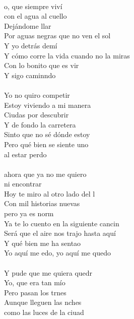 \begin{cancion}%
	     \\
	o, que siempre viví \\
con el agua al cuello\\
	Dejándome llar\\
Por aguas negras que no ven el sol\\
	Y yo detrás demí\\
Y cómo corre la vida cuando no la miras\\
	Con lo bonito que es vir\\
	Y sigo caminndo\\
\jump\\
	Yo no quiro competir\\
Estoy viviendo a mi manera\\
	Ciudas por descubrir\\
Y de fondo la carretera\\
	Sinto que no sé dónde estoy\\
Pero qué bien se siente uno \\
	al estar perdo  \\
\jump\\
	 ahora que ya no me quiero \\
ni encontrar\\
	Hoy te miro al otro lado del l\\
Con mil historias nuevas \\
	pero ya es norm\\
	Ya te lo cuento en la siguiente cancin \\
Será que el aire nos trajo hasta aquí\\
Y qué bien me ha sentao\\
	Yo aquí me edo, yo aquí me quedo\\
\jump\\
	Y pude que me quiera quedr\\
Yo, que era tan mío\\
	Pero pasan los trnes\\
	Aunque lleguen las nches \\
	como las luces de la ciuad\\

\end{cancion}
